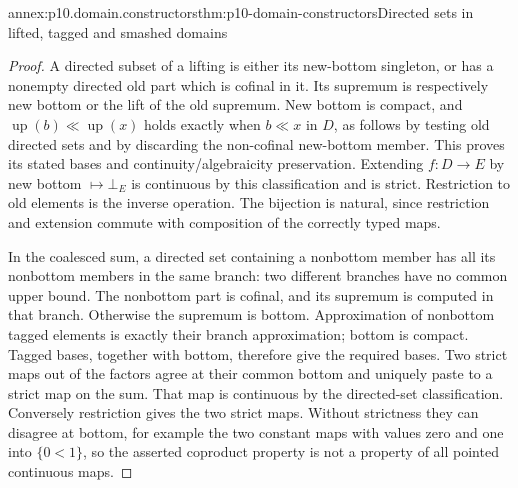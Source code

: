 \begin{annexitem}{annex:p10.domain.constructors}{thm:p10-domain-constructors}{Directed sets in lifted, tagged and smashed domains}
\begin{proof}
A directed subset of a lifting is either its new-bottom singleton,
or has a nonempty directed old part which is cofinal in it.
Its supremum is respectively new bottom or the lift of the old
supremum. New bottom is compact, and
\(\operatorname{up}(b)\ll\operatorname{up}(x)\) holds exactly
when \(b\ll x\) in \(D\), as follows by testing old directed
sets and by discarding the non-cofinal new-bottom member.
This proves its stated bases and continuity/algebraicity preservation.
Extending \(f:D\to E\) by new bottom \(\mapsto\bot_E\)
is continuous by this classification and is strict. Restriction
to old elements is the inverse operation. The bijection is natural,
since restriction and extension commute with composition of the
correctly typed maps.

In the coalesced sum, a directed set containing a nonbottom member
has all its nonbottom members in the same branch: two different
branches have no common upper bound. The nonbottom part is cofinal,
and its supremum is computed in that branch. Otherwise the
supremum is bottom. Approximation of nonbottom tagged elements
is exactly their branch approximation; bottom is compact.
Tagged bases, together with bottom, therefore give the required
bases. Two strict maps out of the factors agree at their common
bottom and uniquely paste to a strict map on the sum. That map
is continuous by the directed-set classification. Conversely
restriction gives the two strict maps. Without strictness they
can disagree at bottom, for example the two constant maps with
values zero and one into \(\{0<1\}\), so the asserted coproduct
property is not a property of all pointed continuous maps.


\end{proof}
\end{annexitem}
